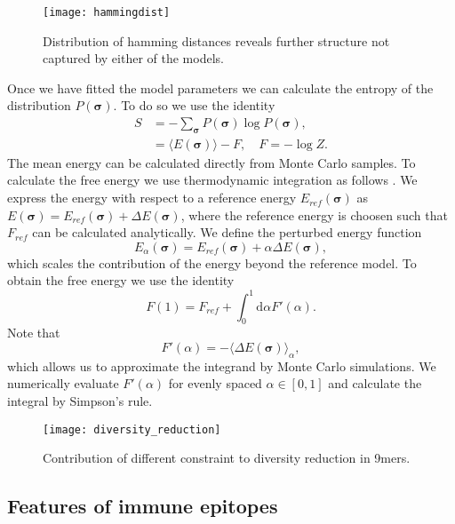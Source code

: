 \documentclass[superscriptaddress,twocolumn,pre]{revtex4}
\newcommand{\B}{\boldsymbol}
\newcommand{\ud}{\mathrm{d}}
\newcommand{\<}{\langle}
\renewcommand{\>}{\rangle}
\begin{document}
\begin{figure}
    \texttt{[image: hammingdist]}
    \caption{Distribution of hamming distances reveals further structure not captured by either of the models.
    \label{fighammingdist}
    }
\end{figure}



Once we have fitted the model parameters we can calculate the entropy of the distribution $P(\B \sigma)$. To do so we use the identity
\begin{align}
    S &= - \sum_{\B \sigma}  P(\B \sigma) \log P(\B \sigma),  \\
      &= \langle E(\B \sigma) \rangle - F, \quad F = - \log Z.
\end{align}
The mean energy can be calculated directly from Monte Carlo samples. To calculate the free energy we use thermodynamic integration as follows \cite{Marchi2019}. We express the energy with respect to a reference energy $E_{ref}(\B \sigma)$ as $E(\B \sigma) = E_{ref}(\B \sigma) + \Delta E(\B\sigma)$, where the reference energy is choosen such that $F_{ref}$ can be calculated analytically. We define the perturbed energy function
\begin{equation}
    E_\alpha(\B \sigma) = E_{ref}(\B \sigma) + \alpha \Delta E(\B\sigma),
\end{equation}
which scales the contribution of the energy beyond the reference model.
To obtain the free energy we use the identity
\begin{equation}
    F(1) = F_{ref} + \int_0^1 \ud \alpha F'(\alpha).
\end{equation}
Note that
\begin{equation}
    F'(\alpha) = - \langle \Delta E(\B \sigma) \rangle_{\alpha},
\end{equation}
which allows us to approximate the integrand by Monte Carlo simulations. We numerically evaluate $F'(\alpha)$ for evenly spaced $\alpha \in [0, 1]$ and calculate the integral by Simpson's rule.

\begin{figure}
    \texttt{[image: diversity\_reduction]}
    \caption{Contribution of different constraint to diversity reduction in 9mers.
    \label{figdiversity_reduction}
    }
\end{figure}






\subsection{Features of immune epitopes}
\end{document}
